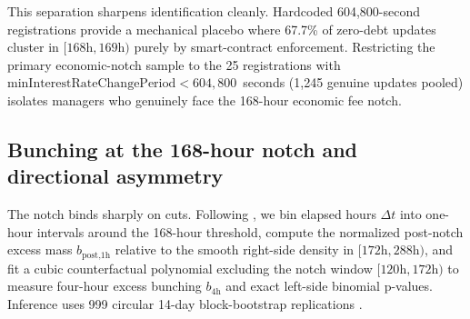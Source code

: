 This separation sharpens identification cleanly. Hardcoded 604,800-second registrations provide a mechanical placebo where 67.7\% of zero-debt updates cluster in $[168\text{h}, 169\text{h})$ purely by smart-contract enforcement. Restricting the primary economic-notch sample to the 25 registrations with $\text{minInterestRateChangePeriod} < 604{,}800$~seconds (1,245 genuine updates pooled) isolates managers who genuinely face the 168-hour economic fee notch.

\subsection{Bunching at the 168-hour notch and directional asymmetry}\label{subsec:bunching}

The notch binds sharply on cuts. Following \citet{kleven2013using}, we bin elapsed hours $\Delta t$ into one-hour intervals around the 168-hour threshold, compute the normalized post-notch excess mass $b_{\text{post,1h}}$ relative to the smooth right-side density in $[172\text{h}, 288\text{h})$, and fit a cubic counterfactual polynomial excluding the notch window $[120\text{h}, 172\text{h})$ to measure four-hour excess bunching $b_{4\text{h}}$ and exact left-side binomial p-values. Inference uses 999 circular 14-day block-bootstrap replications \citep{kunsch1989jackknife}.

